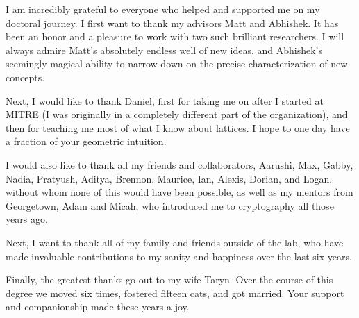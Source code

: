 

I am incredibly grateful to everyone who helped and supported me on my doctoral journey.
I first want to thank my advisors Matt and Abhishek.
It has been an honor and a pleasure to work with two such brilliant researchers.
I will always admire Matt's absolutely endless well of new ideas, and Abhishek's seemingly magical ability to narrow down on the precise characterization of new concepts.

Next, I would like to thank Daniel, first for taking me on after I started at MITRE (I was originally in a completely different part of the  organization), and then for teaching me most of what I know about lattices.
I hope to one day have a fraction of your geometric intuition.

I would also like to thank all my friends and collaborators, Aarushi, Max, Gabby, Nadia, Pratyush, Aditya, Brennon, Maurice, Ian, Alexis, Dorian, and Logan, without whom none of this would have been possible, as well as my mentors from Georgetown, Adam and Micah, who introduced me to cryptography all those years ago.

Next, I want to thank all of my family and friends outside of the lab, who have made invaluable contributions to my sanity and happiness over the last six years.


Finally, the greatest thanks go out to my wife Taryn. Over the course of this degree we moved six times, fostered fifteen cats, and got married. Your support and companionship made these years a joy.
